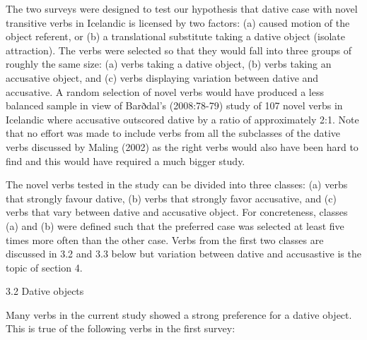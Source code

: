 \begin{styleFootnote}
The two surveys were designed to test our hypothesis that dative case with novel transitive verbs in Icelandic is licensed by two factors: (a) caused motion of the object referent, or (b) a translational substitute taking a dative object (isolate attraction). The verbs were selected so that they would fall into three groups of roughly the same size: (a) verbs taking a dative object, (b) verbs taking an accusative object, and (c) verbs displaying variation between dative and accusative. A random selection of novel verbs would have produced a less balanced sample in view of Barðdal’s (2008:78-79) study of 107 novel verbs in Icelandic where accusative outscored dative by a ratio of approximately 2:1. Note that no effort was made to include verbs from all the subclasses of the dative verbs discussed by Maling (2002) as the right verbs would also have been hard to find and this would have required a much bigger study.
\end{styleFootnote}

\begin{styleStandard}
The novel verbs tested in the study can be divided into three classes: (a) verbs that strongly favour dative, (b) verbs that strongly favor accusative, and (c) verbs that vary between dative and accusative object. For concreteness, classes (a) and (b) were defined such that the preferred case was selected at least five times more often than the other case. Verbs from the first two classes are discussed in 3.2 and 3.3 below but variation between dative and accusastive is the topic of section 4.
\end{styleStandard}

\begin{stylelsSectionii}
3.2 Dative objects
\end{stylelsSectionii}

\begin{styleStandard}
Many verbs in the current study showed a strong preference for a dative object. This is true of the following verbs in the first survey: 
\end{styleStandard}

